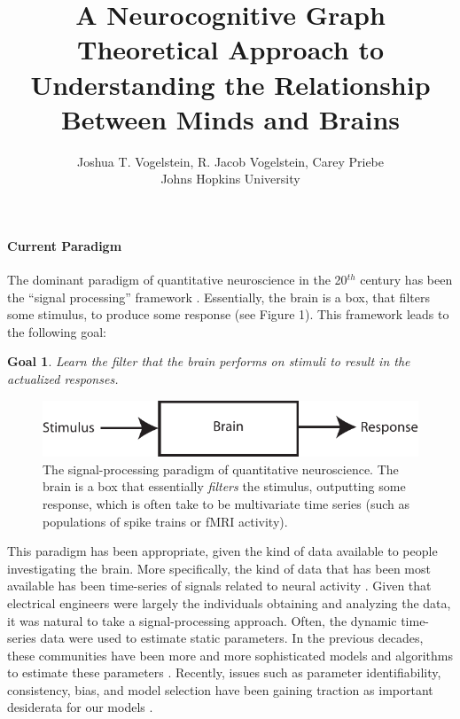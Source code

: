 

\newtheorem{goal}{Goal}
\newtheorem{desid}{Desiderata}
\newcommand{\zz}{\mathbb{Z}}
\newcommand{\nec}{NeCoG}


\title{A Neurocognitive Graph Theoretical Approach to Understanding the Relationship Between Minds and Brains}

\author{Joshua T. Vogelstein, R. Jacob Vogelstein, Carey Priebe\\{Johns Hopkins University}}



\maketitle

\paragraph{Current Paradigm}

The dominant paradigm of quantitative neuroscience in the 20$^{th}$ century has been the ``signal processing'' framework \cite{}.  Essentially, the brain is a box, that filters some stimulus, to produce some response (see Figure 1). This framework leads to the following goal:

\begin{goal}
	Learn the filter that the brain performs on stimuli to result in the actualized responses.
\end{goal}

\begin{figure}[h!]
\centering \includegraphics{stim_brain_resp}
\caption{The signal-processing paradigm of quantitative neuroscience.  The brain is a box that essentially \emph{filters} the stimulus, outputting some response, which is often take to be multivariate time series (such as populations of spike trains or fMRI activity).} \label{fig:SBR}
\end{figure}


This paradigm has been appropriate, given the kind of data available to people investigating the brain.  More specifically, the kind of data that has been most available has been time-series of signals related to neural activity \cite{}.  Given that electrical engineers were largely the individuals obtaining and analyzing the data, it was natural to take a signal-processing approach.  Often, the dynamic time-series data were used to estimate static parameters.  In the previous decades, these communities have been more and more sophisticated models and algorithms to estimate these parameters \cite{}.  Recently, issues such as parameter identifiability, consistency, bias, and model selection have been gaining traction as important desiderata for our models \cite{}.  

